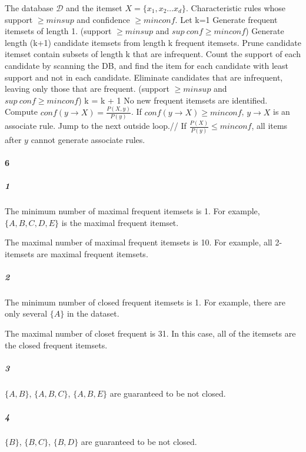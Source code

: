 \documentclass[22pt]{article}
\begin{document}
	\begin{algorithm}
			\begin{algorithmic}[1]
			\REQUIRE The database $\mathcal{D}$ and the itemset $X = \{x_1,x_2\dots x_d\}$.
			\ENSURE Characteristic rules whose support $\geq minsup$ and confidence $\geq minconf$.
			\STATE Let k=1
			\STATE Generate frequent itemsets of length 1. (support $\geq minsup$ and $sup\ conf \geq minconf$)
			\REPEAT 
			\STATE Generate length (k+1) candidate itemsets from length k frequent itemsets.
			\STATE Prune candidate itemset contain subsets of length k that are infrequent.
			\STATE Count the support of each candidate by scanning the DB, and find the item for each candidate with least support and not in each candidate.
			\STATE Eliminate candidates that are infrequent, leaving only those that are frequent. (support $\geq minsup$ and $sup\ conf \geq minconf$)
			\STATE k = k + 1
			\UNTIL No new frequent itemsets are identified. 
			\STATE Compute $conf(y\rightarrow X) = \frac{P(X,y)}{P(y)}$. If $conf(y\rightarrow X) \geq minconf$, $y \rightarrow X$ is an associate rule.
			\ELSE
			\STATE Jump to the next outside loop.// If $\frac{P(X)}{P(y)} \leq minconf$, all items after $y$ cannot generate associate rules.
			\ENDIF
			\ENDFOR
			\ENDFOR
			\end{algorithmic}
			\end{algorithm}


	\paragraph{6} 
	\subparagraph{1} The minimum number of maximal frequent itemsets is 1. For example, $\{A,B,C,D,E\}$ is the maximal frequent itemset.

	The maximal number of maximal frequent itemsets is 10. For example, all 2-itemsets are maximal frequent itemsets.

	\subparagraph{2} The minimum number of closed frequent itemsets is 1. For example, there are only several $\{A\}$ in the dataset.

	The maximal number of closet frequent is 31. In this case, all of the itemsets are the closed frequent itemsets.

	\subparagraph{3} $\{A,B\}$, $\{A,B,C\}$, $\{A,B,E\}$ are guaranteed to be not closed.

	\subparagraph{4} $\{B\}$, $\{B,C\}$, $\{B,D\}$ are guaranteed to be not closed.
\end{document}
